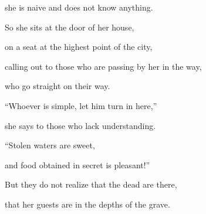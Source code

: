 {\par }{\Q she
is naive
and does not
know
anything.
\par }{\Q {}So she sits
at the door
of her house,
\par }{\Q on
a seat
at the highest
point of the city,
\par }{\Q {}calling out
to those who are passing
by her in the way,
\par }{\Q who go straight
on their way.
\par }{\Q {}“Whoever
is simple,
let him turn
in here,”
\par }{\Q she says to those who lack
understanding.
\par }{\Q {}“Stolen
waters
are sweet,
\par }{\Q and food
obtained in secret
is pleasant!”
\par }{\Q {}But they do not
realize
that
the dead
are there,
\par }{\Q that her guests are in the depths of the grave.


\par }
